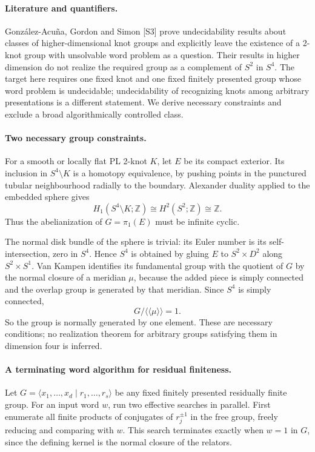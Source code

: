 \documentclass[11pt,a4paper]{article}
\begin{document}
\paragraph{Literature and quantifiers.}
González-Acuña, Gordon and Simon [S3] prove undecidability results about classes of higher-dimensional knot groups and explicitly leave the existence of a 2-knot group with unsolvable word problem as a question. Their results in higher dimension do not realize the required group as a complement of $S^2$ in $S^4$. The target here requires one fixed knot and one fixed finitely presented group whose word problem is undecidable; undecidability of recognizing knots among arbitrary presentations is a different statement. We derive necessary constraints and exclude a broad algorithmically controlled class.

\paragraph{Two necessary group constraints.}
For a smooth or locally flat PL 2-knot $K$, let $E$ be its compact exterior. Its inclusion in $S^4\setminus K$ is a homotopy equivalence, by pushing points in the punctured tubular neighbourhood radially to the boundary. Alexander duality applied to the embedded sphere gives
\[
 H_1(S^4\setminus K;\mathbb Z)\cong H^2(S^2;\mathbb Z)\cong\mathbb Z.
\]
Thus the abelianization of $G=\pi_1(E)$ must be infinite cyclic.

The normal disk bundle of the sphere is trivial: its Euler number is its self-intersection, zero in $S^4$. Hence $S^4$ is obtained by gluing $E$ to $S^2\times D^2$ along $S^2\times S^1$. Van Kampen identifies its fundamental group with the quotient of $G$ by the normal closure of a meridian $\mu$, because the added piece is simply connected and the overlap group is generated by that meridian. Since $S^4$ is simply connected,
\[
 G/\langle\!\langle\mu\rangle\!\rangle=1.
\]
So the group is normally generated by one element. These are necessary conditions; no realization theorem for arbitrary groups satisfying them in dimension four is inferred.

\paragraph{A terminating word algorithm for residual finiteness.}
Let $G=\langle x_1,\ldots,x_d\mid r_1,\ldots,r_s\rangle$ be any fixed finitely presented residually finite group. For an input word $w$, run two effective searches in parallel. First enumerate all finite products of conjugates of $r_j^{\pm1}$ in the free group, freely reducing and comparing with $w$. This search terminates exactly when $w=1$ in $G$, since the defining kernel is the normal closure of the relators.
\end{document}
